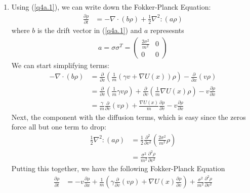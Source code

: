 \documentclass[12pt]{article}
\theoremstyle{plain}
\theoremstyle{definition}
\theoremstyle{remark}
\begin{document}
\begin{enumerate}
\begin{enumerate}
      \item %
        Using (\ref{q4a.1}), we can write down the Fokker-Planck
        Equation:
        \begin{align}
          \frac{\partial \rho}{\partial t}
          &=
          -\nabla \cdot (b \rho)
          + \frac{1}{2} \nabla^2 : (a\rho)
          \label{q4b.1}
        \end{align}
        where $b$ is the drift vector in (\ref{q4a.1}) and $a$
        represesnts
        \begin{align*}
          a = \sigma \sigma^T
          =
          \begin{pmatrix}
            \frac{2\sigma^2}{m^2} & 0 \\
            0 & 0
          \end{pmatrix}
        \end{align*}
        We can start simplifying terms:
        \begin{align*}
          -\nabla \cdot (b \rho)
          &=
          \frac{\partial}{\partial v}
          \left(\frac{1}{m} (\gamma v + \nabla U(x)) \rho\right)
          - \frac{\partial}{\partial x} (v\rho) \\
          &=
          \frac{\partial}{\partial v}
          \left(
          \frac{1}{m} \gamma v \rho
          \right)
          +
          \frac{\partial}{\partial v}
          \left(
          \frac{1}{m} \nabla U(x) \rho
          \right)
          - v\frac{\partial\rho}{\partial x} \\
          &=
          \frac{\gamma}{m}\frac{\partial}{\partial v}
          \left( v \rho \right)
          +
          \frac{\nabla U(x)}{m} \frac{\partial \rho}{\partial v}
          - v\frac{\partial\rho}{\partial x}
        \end{align*}
        Next, the component with the diffusion terms, which is easy
        since the zeros force all but one term to drop:
        \begin{align*}
          \frac{1}{2} \nabla^2 : (a\rho)
          &= \frac{1}{2}\frac{\partial^2}{\partial v^2}
          \left(\frac{2\sigma^2}{m^2}\rho\right)\\
          &= \frac{\sigma^2}{m^2}\frac{\partial^2\rho}{\partial v^2}
        \end{align*}
        Putting this together, we have the following Fokker-Planck
        Equation
        \begin{align*}
          \frac{\partial \rho}{\partial t}
          &=
          - v\frac{\partial\rho}{\partial x}
          + \frac{1}{m}
          \left(
          \gamma \frac{\partial}{\partial v} \left( v \rho \right)
          +
          \nabla U(x)\frac{\partial \rho}{\partial v}
          \right)
          + \frac{\sigma^2}{m^2}\frac{\partial^2\rho}{\partial v^2}
        \end{align*}


\end{enumerate}
\end{enumerate}
\end{document}
